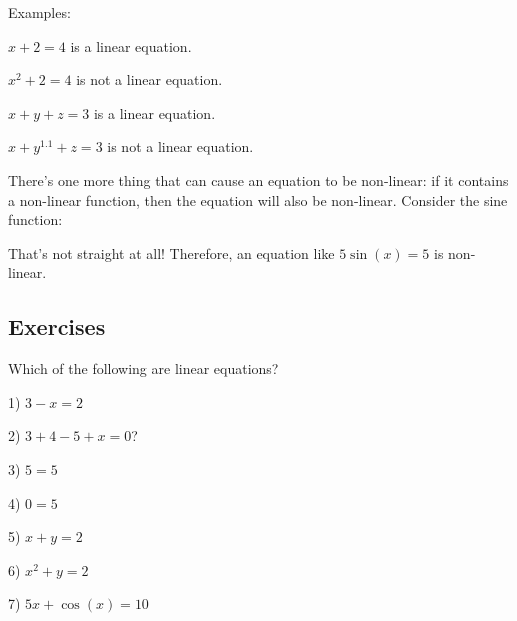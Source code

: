 \documentclass[a4paper,twoside,12pt]{memoir}  %
\begin{document}
Examples:
\begin{list}{}
\item $x + 2 = 4$ is a linear equation.
\item $x^2 + 2 = 4$ is not a linear equation.
\item $x + y + z = 3$ is a linear equation.
\item $x + y^1.1 + z = 3$ is not a linear equation.
\end{list}

There's one more thing that can cause an equation to be non-linear: if it contains a non-linear function, then the equation will also be non-linear. Consider the sine function:


That's not straight at all! Therefore, an equation like $5 \sin(x) = 5$ is non-linear.

\subsection{Exercises}
Which of the following are linear equations?
\begin{list}{}
\item 1) $3 - x = 2$
\item 2) $3 + 4 -5 + x = 0$?
\item 3) $5 = 5$
\item 4) $0 = 5$
\item 5) $x + y = 2$
\item 6) $x^2 + y = 2$
\item 7) $5x + \cos(x) = 10$
\end{list}
\end{document}
